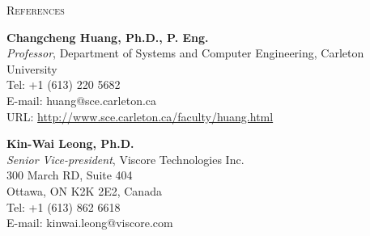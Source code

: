 \documentclass[letterpaper,11pt]{article}
\newcommand{\resheading}[1]{{\noindent\large \colorbox{mygrey}{
\begin{minipage}{1.0\textwidth}{\textsc{#1 \vphantom{p\^{E}}}}\end{minipage}}}}
\begin{document}
\resheading{References}%

\leftskip 0.2in %


%
%
\vspace{0.2in}%
\textbf{Changcheng Huang, Ph.D., P. Eng.}\\
\textit{Professor}, Department of Systems and Computer Engineering,
Carleton University\\
Tel: +1 (613) 220 5682\\ %
E-mail: huang@sce.carleton.ca\\
URL: \url{http://www.sce.carleton.ca/faculty/huang.html}




\vspace{0.2in}%
\textbf{Kin-Wai Leong, Ph.D.}\\
\textit{Senior Vice-president}, Viscore Technologies Inc.\\
300 March RD, Suite 404\\
Ottawa, ON K2K 2E2, Canada\\
Tel: +1 (613) 862 6618\\
E-mail: kinwai.leong@viscore.com\\ 
\end{document}
